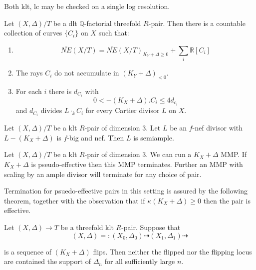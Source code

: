 \documentclass[a4paper,12pt]{amsart}
\begin{document}
	Both klt, lc may be checked on a single log resolution.
	
	
	\begin{theorem}\cite[Theorem H]{bhatt2020globally+}
		Let $(X,\Delta)/T$ be a dlt $\mathbb{Q}$-factorial threefold $R$-pair. Then there is a countable collection of curves $\{C_{i}\}$ on $X$ such that:
		\begin{enumerate}
			\item $$\overline{NE}(X/T)=\overline{NE}(X/T)_{K_{Y}+\Delta \geq 0} + \sum_{i} \mathbb{R}[C_{i}]$$
			\item The rays $C_{i}$ do not accumulate in $(K_{Y}+\Delta)_{<0}$.
			\item For each $i$ there is $d_{C_{i}}$ with 
			\[0 < -(K_{X}+\Delta).C_{i} \leq 4d_{c_{i}}\]
			and $d_{C_{i}}$ divides $L\cdot_{k}C_{i}$ for every Cartier divisor $L$ on $X$.
		\end{enumerate}
	\end{theorem}
	
	\begin{theorem}\cite[Theorem G]{bhatt2020globally+}\label{bpt}
		Let $(X,\Delta)/T$ be a klt $R$-pair of dimension $3$. Let $L$ be an $f$-nef divisor with $L-(K_{X}+\Delta)$ is $f$-big and nef. Then $L$ is semiample. 
	\end{theorem}
	
	\begin{theorem}\cite[Theorem F]{bhatt2020globally+}
		
		Let $(X,\Delta)/T$ be a klt $R$-pair of dimension $3$. We can run a $K_{X}+\Delta$ MMP. If $K_{X}+\Delta$ is pseudo-effective then this MMP terminates. Further an MMP with scaling by an ample divisor will terminate for any choice of pair.
		
	\end{theorem}
	
	Termination for psuedo-effective pairs in this setting is assured by the following theorem, together with the observation that if $\kappa(K_{X}+\Delta) \geq 0$ then the pair is effective. 
	
	\begin{theorem}\cite[Proposition 9.20]{bhatt2020globally+}\label{partial-termination}
		Let $(X,\Delta)\to T$ be a threefold klt $R$-pair. Suppose that
		$$(X,\Delta)=:(X_{0},\Delta_{0}) \dashrightarrow (X_{1},\Delta_{1}) \dashrightarrow$$
		
		is a sequence of $(K_{X}+\Delta)$ flips. Then neither the flipped nor the flipping locus are contained the support of $\Delta_{n}$ for all sufficiently large $n$.
	\end{theorem}
\end{document}
